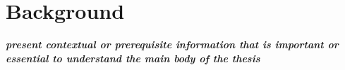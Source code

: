 \section{Background}
\textbf{\textit{present contextual or prerequisite information that is important or essential to understand the main body of the thesis}}










